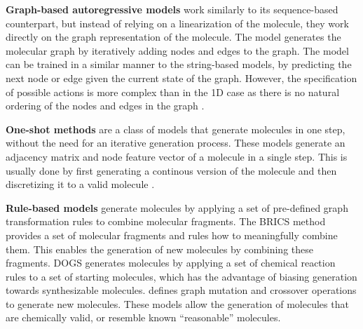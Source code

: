 \textbf{Graph-based autoregressive models} work similarly to its sequence-based counterpart, but
instead of relying on a linearization of the molecule, they work directly on the graph representation
of the molecule. The model generates the molecular graph by iteratively adding nodes and edges to the
graph. The model can be trained in a similar manner to the string-based models, by
predicting the next node or edge given the current state of the graph. However, the specification of
possible actions is more complex than in the 1D case as there is no natural ordering of the
nodes and edges in the graph \citep{liuConstrainedGraphVariational2018,liLearningDeepGenerative2018,youGraphConvolutionalPolicy2019,cohen-karlikOvercomingOrderAutoregressive2024}.

\textbf{One-shot methods} are a class of models that generate molecules in one step, without the
need for an iterative generation process. These models generate an adjacency matrix and node feature
vector of a molecule in a single step. This is usually done by first generating a continous version
of the molecule and then discretizing it to a valid molecule \citep{decaoMolGANImplicitGenerative2018,madhawaGraphNVPInvertibleFlow2019}.

\textbf{Rule-based models} generate molecules by applying a set of pre-defined graph transformation rules to
combine molecular fragments. The BRICS \citep{degenArtCompilingUsing2008} method provides a set of
molecular fragments and rules how to meaningfully combine them. This enables the generation of new
molecules by combining these fragments. DOGS \citep{hartenfellerDOGSReactionDrivenNovo2012}
generates molecules by applying a set of chemical reaction rules to a set of starting molecules,
which has the advantage of biasing generation towards synthesizable molecules.\@
\citet{jensenGraphbasedGeneticAlgorithm2019} defines graph mutation and crossover operations to
generate new molecules. These models allow the generation of molecules that are chemically valid, or
resemble known ``reasonable'' molecules.


